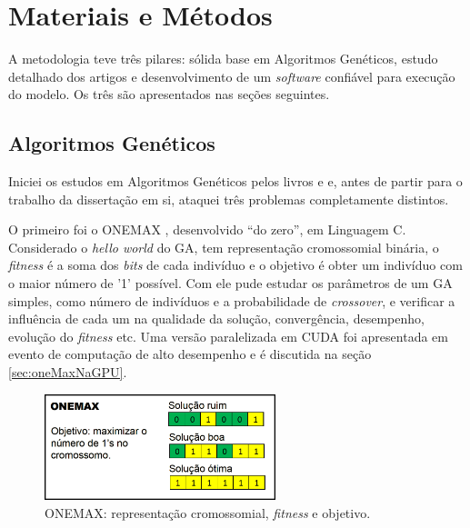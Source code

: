\chapter{Materiais e Métodos\label{cap:metodologia}}

	A metodologia teve três pilares: sólida base em Algoritmos Genéticos, estudo detalhado dos artigos e desenvolvimento de um \emph{software} confiável para execução do modelo. Os três são apresentados nas seções seguintes.

\section{Algoritmos Genéticos}\label{seq:medologia_ga}
	
	Iniciei os estudos em Algoritmos Genéticos pelos livros \cite{Mitchell98} e \cite{Linden2008} e, antes de partir para o trabalho da dissertação em si, ataquei três problemas completamente distintos.
	
	O primeiro foi o ONEMAX \cite{onemaxNaGPU}, desenvolvido ``do zero'', em Linguagem C. Considerado o \emph{hello world} do GA, tem representação cromossomial binária, o \emph{fitness} é a soma dos \emph{bits} de cada indivíduo e o objetivo é obter um indivíduo com o maior número de '1' possível. Com ele pude estudar os parâmetros de um GA simples, como número de indivíduos e a probabilidade de \emph{crossover}, e verificar a influência de cada um na qualidade da solução, convergência, desempenho, evolução do \emph{fitness} etc. Uma versão paralelizada em CUDA foi apresentada em evento de computação de alto desempenho \cite{ERAD12} e é discutida na seção \ref{sec:oneMaxNaGPU}.
	
	\begin{figure}[htbp]
		\centering
			\includegraphics[width=0.60\textwidth]{figs/resultados/onemax/onemax_objetivo.png}
		\caption{ONEMAX: representação cromossomial, \emph{fitness} e objetivo.}
		\label{fig:onemax_objetivo_metodologia}
	\end{figure}
	
